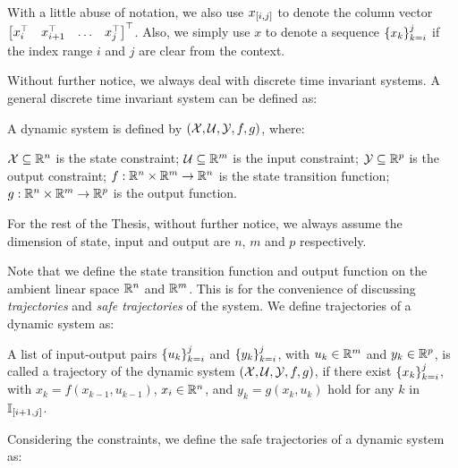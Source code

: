 With a little abuse of notation, we also use $x_{\left[ i, j \right]}$ to denote the column vector $\begin{bmatrix}
    x_i^{\top} & x_{i+1}^{\top} & \ldots & x_j^{\top}
\end{bmatrix}^{\top}$.
Also, we simply use $x$ to denote a sequence $\left\{x_k\right\}_{k=i}^{j}$ if the index range $i$ and $j$ are clear from the context.

Without further notice, we always deal with discrete time invariant systems.
A general discrete time invariant system can be defined as:

\begin{definition}\label{def:dynamic-system}
    A dynamic system is defined by $\left(\mathcal{X}, \mathcal{U}, \mathcal{Y}, f, g\right)$, where:

    $\mathcal{X} \subseteq \mathbb{R}^n$ is the state constraint; $\mathcal{U} \subseteq \mathbb{R}^m$ is the input constraint; $\mathcal{Y} \subseteq \mathbb{R}^p$ is the output constraint; $f: \mathbb{R}^n \times \mathbb{R}^m \rightarrow \mathbb{R}^n$ is the state transition function; $g: \mathbb{R}^n \times \mathbb{R}^m \rightarrow \mathbb{R}^p$ is the output function.

    For the rest of the Thesis, without further notice, we always assume the dimension of state, input and output are $n$, $m$ and $p$ respectively.
\end{definition}

Note that we define the state transition function and output function on the ambient linear space $\mathbb{R}^n$ and $\mathbb{R}^m$.
This is for the convenience of discussing \emph{trajectories} and \emph{safe trajectories} of the system.
We define trajectories of a dynamic system as:

\begin{definition}\label{def:traj-dynamical-system}
    A list of input-output pairs $\left\{u_k\right\}_{k=i}^{j}$ and $\left\{y_k\right\}_{k=i}^{j}$, with $u_k \in \mathbb{R}^m$ and $y_k \in \mathbb{R}^p$, is called a trajectory of the dynamic system $\left(\mathcal{X}, \mathcal{U}, \mathcal{Y}, f, g\right)$, if there exist $\left\{x_k\right\}_{k=i}^{j}$, with $x_k = f\left(x_{k-1}, u_{k-1}\right)$, $x_i \in \mathbb{R}^n$, and $y_k = g\left(x_k, u_k\right)$ hold for any $k$ in $\mathbb{I}_{\left[ i+1, j \right]}$.
\end{definition}

Considering the constraints, we define the safe trajectories of a dynamic system as:

